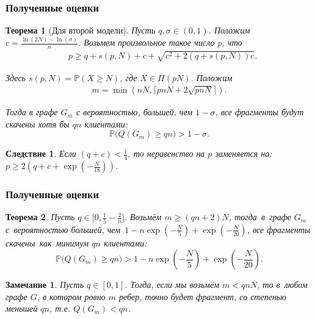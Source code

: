 \documentclass[pdf, intlimits, 12pt, unicode]{beamer} %
\newcommand{\PRob}{\mathbb P}
\newcommand{\geqs}{\geqslant}
\newtheorem*{theoremm}{Теорема}
\newtheorem*{cons}{Следствие}
\newtheorem*{notee}{Замечание}
\begin{document}
\begin{frame}
	\frametitle{Полученные оценки}
	\begin{theoremm}[Для второй модели]
		Пусть $q, \sigma \in (0, 1)$. Положим $c = \frac{\ln(2N) - \ln(\sigma)}{n}$.
		Возьмем произвольное такое число $p$, что 
			\vspace{-3mm}
			\begin{align*}
			& p \geqs q + s(p, N) + c + \sqrt{c^2+2(q+s(p, N))c}.
			\end{align*}
			\vspace{-7mm}
			
		Здесь $s(p,N) = \PRob(X \geqs N)$, где $X \in \Pi(pN)$. Положим
			\vspace{-3mm}
			\begin{align*}
			m = \min(nN, \lceil pnN + 2\sqrt{pnN} \rceil).
			\end{align*}
			\vspace{-7mm}
			
		Тогда в графе $G_m$ с вероятностью, большей, чем $1 - \sigma$, все фрагменты будут скачены хотя бы $qn$ клиентами:
			\vspace{-3mm}
			\begin{equation*}
			\PRob\big(Q(G_m) \geqs qn\big) > 1 - \sigma.
			\end{equation*}
	\end{theoremm}

	\begin{cons}
		Если $(q+c) < \frac{1}{4}$, то неравенство на $p$ заменяется на:\\
		\quad\quad\quad\quad\quad\quad\quad
		$p \geqs 2\left(q + c + \exp\left(-\frac{N}{18}\right) \right)$.
	\end{cons}
\end{frame}


\begin{frame}	
	\frametitle{Полученные оценки}
	\begin{theoremm}
		Пусть $q \in \big[0, \frac{1}{5} - \frac{2}{n}\big]$. 
		Возьмём $m \geqs (qn + 2) N$, тогда~в~графе $G_m$ с~вероятностью большей, 
		чем~$1 - n\exp\left(-\frac{N}{5}\right) +  \exp\left(- \frac{N}{20}\right)$, все фрагменты 
		скачены~как~минимум $qn$ клиентами:
		\vspace{-3mm}
		\begin{equation*}
		\PRob\Big( Q(G_m) \geqs qn \Big) > 1 - n\exp\left(-\frac{N}{5}\right) +  \exp\left(- \frac{N}{20}\right).
		\end{equation*}
	\end{theoremm}
	
	\begin{notee}
		Пусть $q \in [0,1]$. Тогда, если мы возьмём $m < qnN$, то в~любом графе $G$, в котором ровно $m$ ребер, точно будет фрагмент, 
		со степенью меньшей $qn$, т.е. $Q(G_m) < qn$.
	\end{notee}

\end{frame}
\end{document}
